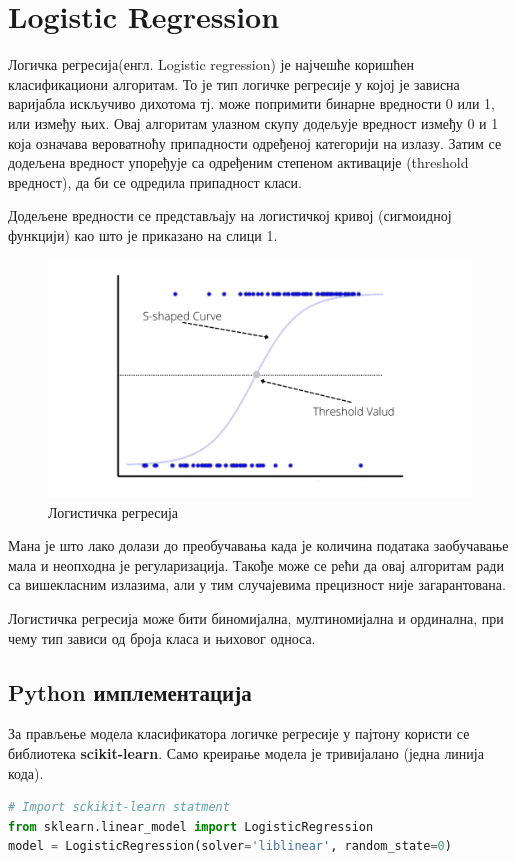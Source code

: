\documentclass[11pt]{article} %
\begin{document}
\section{Logistic Regression}

Логичка регресија(енгл. Logistic regression) је најчешће коришћен класификациони алгоритам. То је тип логичке регресије у којој је зависна варијабла искључиво дихотома тј. може попримити бинарне вредности 0 или 1, или између њих. Овај алгоритам улазном скупу додељује вредност између 0 и 1 која означава вероватноћу
припадности одређеној категорији на излазу. Затим се додељена вредност упоређује са
одређеним степеном активације (threshold вредност), да би се одредила припадност класи.

Додељене вредности се представљају на логистичкој кривој (сигмоидној функцији)
као што је приказано на слици 1.

\begin{figure}[h]
	\includegraphics[scale=0.4]{Logistic-regression-using-python-s-shpaed}
	\caption{Логистичка регресија}
\end{figure}

Мана је што лако долази до преобучавања када је количина података заобучавање мала и неопходна је регуларизација. Такође може се рећи да овај алгоритам ради са вишекласним излазима, али у тим случајевима прецизност није загарантована.

Логистичка регресија може бити биномијална, мултиномијална и ординална, при
чему тип зависи од броја класа и њиховог односа.

\subsection{Python имплементација}
За прављење модела класификатора логичке регресије у пајтону користи се библиотека \textbf{scikit-learn}. Само креирање модела је тривијалано (једна линија кода).
\begin{lstlisting}[language=Python,title=Пример 1. Логичка регресија]
# Import sckikit-learn statment
from sklearn.linear_model import LogisticRegression
model = LogisticRegression(solver='liblinear', random_state=0)
\end{lstlisting}
\end{document}
